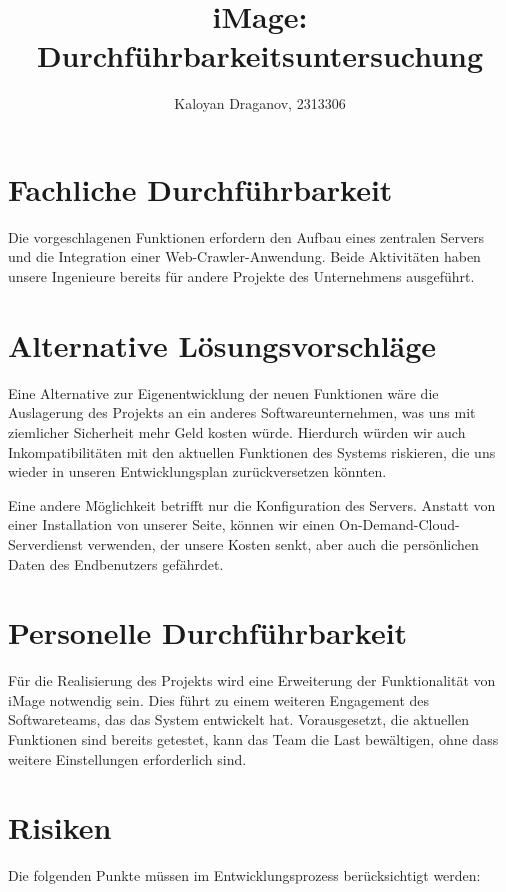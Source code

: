 \documentclass[parskip=full]{scrartcl}
\title{iMage: Durchführbarkeitsuntersuchung}
\author{Kaloyan Draganov, 2313306}
\begin{document}
\maketitle

\section{Fachliche Durchführbarkeit}

Die vorgeschlagenen Funktionen erfordern den Aufbau eines zentralen Servers und die Integration einer Web-Crawler-Anwendung. Beide Aktivitäten haben unsere Ingenieure bereits für andere Projekte des Unternehmens ausgeführt.

\section{Alternative Lösungsvorschläge}

Eine Alternative zur Eigenentwicklung der neuen Funktionen wäre die Auslagerung des Projekts an ein anderes Softwareunternehmen, was uns mit ziemlicher Sicherheit mehr Geld kosten würde. Hierdurch würden wir auch Inkompatibilitäten mit den aktuellen Funktionen des Systems riskieren, die uns wieder in unseren Entwicklungsplan zurückversetzen könnten.

Eine andere Möglichkeit betrifft nur die Konfiguration des Servers. Anstatt von einer Installation von unserer Seite, können wir einen On-Demand-Cloud-Serverdienst verwenden, der unsere Kosten senkt, aber auch die persönlichen Daten des Endbenutzers gefährdet.

\section{Personelle Durchführbarkeit}

Für die Realisierung des Projekts wird eine Erweiterung der Funktionalität von iMage notwendig sein. Dies führt zu einem weiteren Engagement des Softwareteams, das das System entwickelt hat. Vorausgesetzt, die aktuellen Funktionen sind bereits getestet, kann das Team die Last bewältigen, ohne dass weitere Einstellungen erforderlich sind.

\section{Risiken}

Die folgenden Punkte müssen im Entwicklungsprozess berücksichtigt werden:
\end{document}
